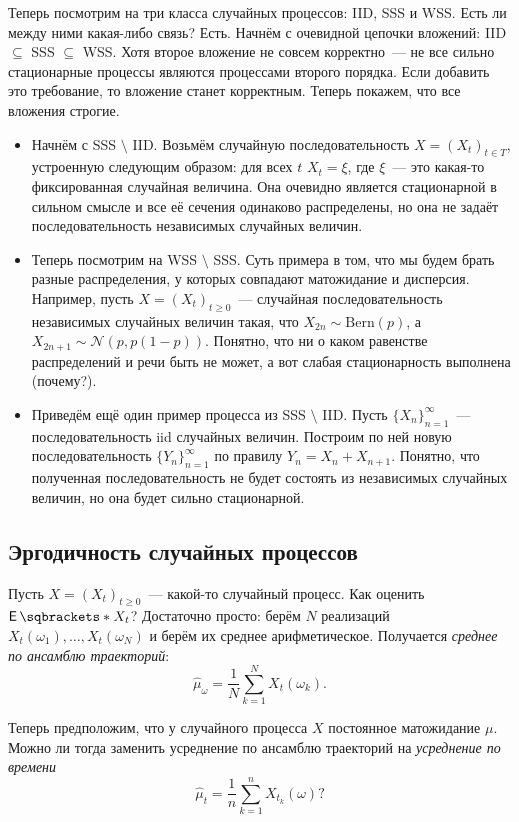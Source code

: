 Теперь посмотрим на три класса случайных процессов: IID, SSS и WSS. Есть ли 
между ними какая-либо связь? Есть. Начнём с очевидной цепочки вложений: IID 
\(\subseteq\) SSS \(\subseteq\) WSS. Хотя второе вложение не совсем 
корректно~--- не все сильно стационарные процессы являются процессами второго 
порядка. Если добавить это требование, то вложение станет корректным. Теперь 
покажем, что все вложения строгие.
\begin{itemize}
	\item Начнём с SSS \(\setminus\) IID. Возьмём случайную последовательность 
	\(X = (X_{t})_{t \in T}\), устроенную следующим образом: для всех \(t\) 
	\(X_{t} = \xi\), где \(\xi\)~--- это какая-то фиксированная случайная 
	величина. Она очевидно является стационарной в сильном смысле и все её 
	сечения одинаково распределены, но она не задаёт последовательность 
	независимых случайных величин.
	\item Теперь посмотрим на WSS \(\setminus\) SSS. Суть примера в том, что мы 
	будем брать разные распределения, у которых совпадают матожидание и 
	дисперсия. Например, пусть \(X = (X_{t})_{t \geq 0}\)~--- случайная 
	последовательность независимых случайных величин такая, что \(X_{2n} \sim 
	\mathrm{Bern}(p)\), а \(X_{2n + 1} \sim \mathcal{N}(p, p(1 - p))\). 
	Понятно, что ни о каком равенстве распределений и речи быть не может, а вот 
	слабая стационарность выполнена (почему?).
	\item Приведём ещё один пример процесса из SSS \(\setminus\) IID. Пусть 
	\(\{X_{n}\}_{n = 1}^{\infty}\)~--- последовательность iid случайных 
	величин. Построим по ней новую последовательность \(\{Y_{n}\}_{n = 
	1}^{\infty}\) по правилу \(Y_{n} = X_{n} + X_{n + 1}\). Понятно, что 
	полученная последовательность не будет состоять из независимых случайных 
	величин, но она будет сильно стационарной.
\end{itemize}

\subsection{Эргодичность случайных процессов}
Пусть \(X = (X_{t})_{t \geq 0}\)~--- какой-то случайный процесс. Как оценить 
\(\E{X_{t}}\)? Достаточно просто: берём \(N\) реализаций \(X_{t}(\omega_{1}), 
\ldots, X_{t}(\omega_{N})\) и берём их среднее арифметическое. Получается 
\emph{среднее по ансамблю траекторий}:
\[
	\hat{\mu}_{\omega} = \frac{1}{N}\sum_{k = 1}^{N} X_{t}(\omega_{k}).
\]

Теперь предположим, что у случайного процесса \(X\) постоянное матожидание 
\(\mu\). Можно ли тогда заменить усреднение по ансамблю траекторий на 
\emph{усреднение по времени}
\[
	\hat{\mu}_{t} = \frac{1}{n}\sum_{k = 1}^{n} X_{t_{k}}(\omega)?
\]

